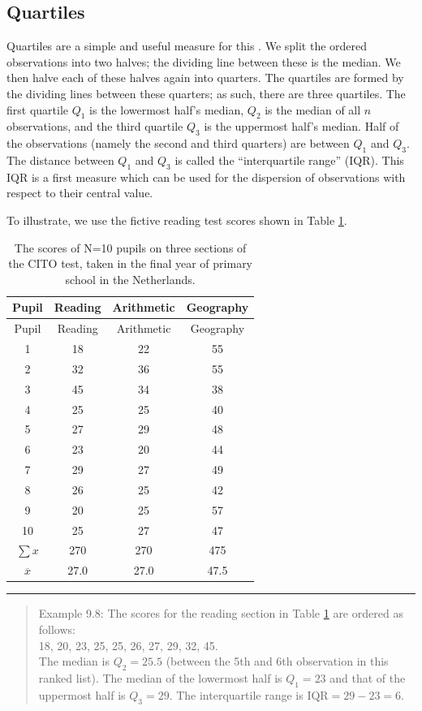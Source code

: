 \documentclass[
]{book}
\begin{document}
\hypertarget{quartiles}{%
\subsection{Quartiles}\label{quartiles}}

Quartiles are a simple and useful measure for this \citep{Tukey77}.
We split the ordered observations into two halves; the dividing line
between these is the median. We then halve each of these halves again into quarters.
The quartiles are formed by the dividing lines between these
quarters; as such, there are three quartiles. The first quartile \(Q_1\) is the lowermost half's median,
\(Q_2\) is the median of all \(n\) observations, and the third quartile \(Q_3\) is the uppermost half's median.
Half of the observations (namely the second and third quarters) are
between \(Q_1\) and \(Q_3\). The distance between \(Q_1\) and \(Q_3\) is
called the ``interquartile range'' (IQR). This IQR is a first measure which
can be used for the dispersion of observations with respect to their
central value.

To illustrate, we use the fictive reading test scores shown in Table
\ref{tab:cito}.

\begin{longtable}[]{@{}cccc@{}}
\caption{\label{tab:cito} The scores of N=10 pupils on three sections of the CITO test,
taken in the final year of primary school in the Netherlands.}\tabularnewline
\toprule
Pupil & Reading & Arithmetic & Geography\tabularnewline
\midrule
\endfirsthead
\toprule
Pupil & Reading & Arithmetic & Geography\tabularnewline
\midrule
\endhead
1 & 18 & 22 & 55\tabularnewline
2 & 32 & 36 & 55\tabularnewline
3 & 45 & 34 & 38\tabularnewline
4 & 25 & 25 & 40\tabularnewline
5 & 27 & 29 & 48\tabularnewline
6 & 23 & 20 & 44\tabularnewline
7 & 29 & 27 & 49\tabularnewline
8 & 26 & 25 & 42\tabularnewline
9 & 20 & 25 & 57\tabularnewline
10 & 25 & 27 & 47\tabularnewline
\(\sum x\) & 270 & 270 & 475\tabularnewline
\(\overline{x}\) & 27.0 & 27.0 & 47.5\tabularnewline
\bottomrule
\end{longtable}

\begin{center}\rule{0.5\linewidth}{0.5pt}\end{center}

\begin{quote}
Example 9.8:
The scores for the reading section in
Table \ref{tab:cito} are
ordered as follows:\\
18, 20, 23, 25, 25, 26, 27, 29, 32, 45.\\
The median is \(Q_2=25.5\) (between the 5th and 6th observation in this
ranked list). The median of the lowermost half is \(Q_1=23\) and that of the
uppermost half is \(Q_3=29\). The interquartile range is
\(\textrm{IQR}=29-23=6\).
\end{quote}
\end{document}
